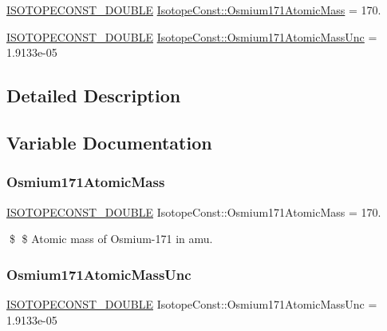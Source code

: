 \begin{DoxyCompactItemize}
\item 
\mbox{\hyperlink{group___isotope_const-_macros_ga8f45a7272ce02c0b4c65c44636ed719a}{I\+S\+O\+T\+O\+P\+E\+C\+O\+N\+S\+T\+\_\+\+D\+O\+U\+B\+LE}} \mbox{\hyperlink{group___isotope_const-_osmium-_os171_gae772f93e367ce875dbeb7243d92bb37e}{Isotope\+Const\+::\+Osmium171\+Atomic\+Mass}} = 170.
\item 
\mbox{\hyperlink{group___isotope_const-_macros_ga8f45a7272ce02c0b4c65c44636ed719a}{I\+S\+O\+T\+O\+P\+E\+C\+O\+N\+S\+T\+\_\+\+D\+O\+U\+B\+LE}} \mbox{\hyperlink{group___isotope_const-_osmium-_os171_ga8b0f292aa0fc34740af7ba8e71a4a514}{Isotope\+Const\+::\+Osmium171\+Atomic\+Mass\+Unc}} = 1.\+9133e-\/05
\end{DoxyCompactItemize}


\subsection{Detailed Description}


\subsection{Variable Documentation}
\mbox{\label{group___isotope_const-_osmium-_os171_gae772f93e367ce875dbeb7243d92bb37e}} 
\subsubsection{\texorpdfstring{Osmium171\+Atomic\+Mass}{Osmium171AtomicMass}}
{\footnotesize\ttfamily \mbox{\hyperlink{group___isotope_const-_macros_ga8f45a7272ce02c0b4c65c44636ed719a}{I\+S\+O\+T\+O\+P\+E\+C\+O\+N\+S\+T\+\_\+\+D\+O\+U\+B\+LE}} Isotope\+Const\+::\+Osmium171\+Atomic\+Mass = 170.}

\$ \$ Atomic mass of Osmium-\/171 in amu. \mbox{\label{group___isotope_const-_osmium-_os171_ga8b0f292aa0fc34740af7ba8e71a4a514}} 
\subsubsection{\texorpdfstring{Osmium171\+Atomic\+Mass\+Unc}{Osmium171AtomicMassUnc}}
{\footnotesize\ttfamily \mbox{\hyperlink{group___isotope_const-_macros_ga8f45a7272ce02c0b4c65c44636ed719a}{I\+S\+O\+T\+O\+P\+E\+C\+O\+N\+S\+T\+\_\+\+D\+O\+U\+B\+LE}} Isotope\+Const\+::\+Osmium171\+Atomic\+Mass\+Unc = 1.\+9133e-\/05}

